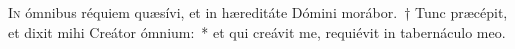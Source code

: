 \lettrine{I}{n} ómnibus réquiem quæsívi, et in hæreditáte Dómini morábor.~† Tunc præcépit, et dixit mihi Creátor ómnium:~* et qui
creávit me, requiévit in tabernáculo meo.